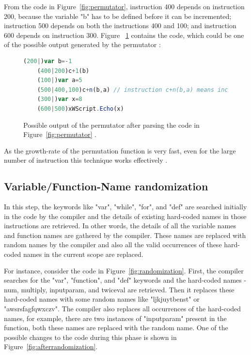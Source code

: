 From the code in Figure~\ref{fig:permutator}, instruction 400 depends on instruction 200, because the variable "b" has to be defined before it can be incremented; instruction 500 depends on both the instructions 400 and 100; and instruction 600 depends on instruction 300. Figure ~\ref{fig:afterpermutator} contains the code, which could be one of the possible output generated by the permutator \cite{bib4}:

\begin{figure}
  \centering
  \begin{lstlisting}[language=JavaScript]
	(200|)var b=-1
	(400|200)c+1(b)
	(100|)var a=5	
	(500|400,100)c+n(b,a) // instruction c+n(b,a) means increment b by a: i.e. b+=a
	(300|)var x=8
	(600|500)xWScript.Echo(x)
\end{lstlisting}
    \caption[Permutator output]{Possible output of the permutator after parsing the code in Figure~\ref{fig:permutator} \cite{bib4}.}
    \label{fig:afterpermutator}
\end{figure}

As the growth-rate of the permutation function is very fast, even for the large number of instruction this technique works effectively \cite{bib26}.

\subsection{Variable/Function-Name randomization}

In this step, the keywords like "var", "while", "for", and "def" are searched initially in the code by the compiler and the details of existing hard-coded names in those instructions are retrieved. In other words, the details of all the variable names and function names are gathered by the compiler. These names are replaced with random names by the compiler and also all the valid occurrences of these hard-coded names in the current scope are replaced.

For instance, consider the code in Figure~\ref{fig:randomization}. First, the compiler searches for the "var", "function", and "def" keywords and the hard-coded names - num, multiply, inputparam, and twiceval are retrieved. Then it replaces these hard-coded names with some random names like "ljkjuytbenst" or "awsrsfagfqwxczv". The compiler also replaces all occurrences of the hard-coded names, for example, there are two instances of "inputparam" present in the function, both these names are replaced with the random name. One of the possible changes to the code during this phase is shown in Figure~\ref{fig:afterrandomization}. 

